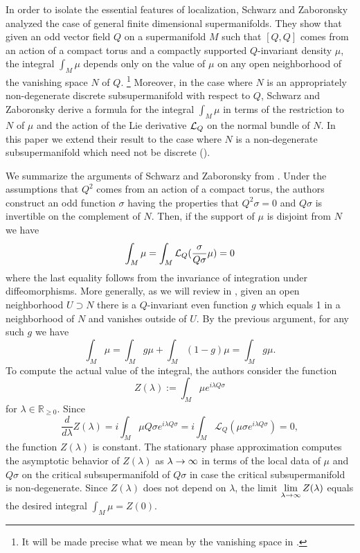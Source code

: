\documentclass[11pt]{amsart}
\numberwithin{equation}{section}
\numberwithin{figure}{section}
\theoremstyle{plain}
\theoremstyle{definition}
\theoremstyle{remark}
\begin{document}
In order to isolate the essential features of localization, Schwarz
and Zaboronsky \cite{SuppersymmetryAndLocalization} analyzed  the
case of general finite dimensional supermanifolds. They show that
given an odd vector field $Q$ on a supermanifold $M$ such that $[Q,Q]$
comes from an action of a compact torus and a compactly supported
$Q$-invariant density $\mu$, the integral $\int_{M}\mu$ depends
only on the value of $\mu$ on any open neighborhood of the vanishing
space $N$ of $Q$.%
\footnote{It will be made precise what we mean by the vanishing space in .%
} Moreover, in the case where $N$ is an appropriately non-degenerate
discrete subsupermanifold with respect to $Q$, Schwarz and Zaboronsky
derive a formula for the integral $\int_{M}\mu$ in terms of the restriction
to $N$ of $\mu$ and the action of the Lie derivative $\mathcal{L}_{Q}$
on the normal bundle of $N$. In this paper we extend their result
to the case where $N$ is a non-degenerate subsupermanifold which
need not be discrete (). 

We summarize the arguments of Schwarz and Zaboronsky from \cite{SuppersymmetryAndLocalization}.
Under the assumptions that $Q^{2}$ comes from an action of a compact
torus, the authors construct an odd function $\sigma$ having the
properties that $Q^{2}\sigma=0$ and $Q\sigma$ is invertible on the
complement of $N$. Then, if the support of $\mu$ is disjoint from
$N$ we have 
\[
\int_{M}\mu=\int_{M}\mathcal{L}_{Q}(\frac{\sigma}{Q\sigma}\mu)=0
\]
where the last equality follows from the invariance of integration
under diffeomorphisms. More generally, as we will review in ,
given an open neighborhood $U\supset N$ there is a $Q$-invariant
even function $g$ which equals 1 in a neighborhood of $N$ and vanishes
outside of $U$. By the previous argument, for any such $g$ we have
\[
\int_{M}\mu=\int_{M}g\mu+\int_{M}(1-g)\mu=\int_{M}g\mu.
\]
To compute the actual value of the integral, the authors consider
the function
\[
Z(\lambda):=\int_{M}\mu e^{i\lambda Q\sigma}
\]
for $\lambda\in\mathbb{R}_{\geq0}$. Since 
\[
\frac{d}{d\lambda}Z(\lambda)=i\int_{M}\mu Q\sigma e^{i\lambda Q\sigma}=i\int_{M}\mathcal{L}_{Q}(\mu\sigma e^{i\lambda Q\sigma})=0,
\]
the function $Z(\lambda)$ is constant. The stationary phase approximation
computes the asymptotic behavior of $Z(\lambda)$ as $\lambda\rightarrow\infty$
in terms of the local data of $\mu$ and $Q\sigma$ on the critical
subsupermanifold of $Q\sigma$ in case the critical subsupermanifold
is non-degenerate. Since $Z(\lambda)$ does not depend on $\lambda$,
the limit ${\displaystyle \lim_{\lambda\rightarrow\infty}Z(\lambda)}$ equals
the desired integral ${\displaystyle \int_{M}\mu}=Z(0)$. 
\end{document}

